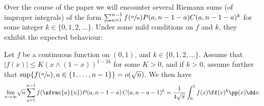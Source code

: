 Over the course of the paper we will encounter several Riemann sums (of improper integrals) of the form
$
\sum_{a=1}^{n-1} f(\sfrac{a}{n})P(a,n-1-a) C(a,n-1-a)^k
$ for some integer $k \in \{0,1,2,\dots \}$. Under some mild conditions on $f$ and $k$, they exhibit the expected behaviour:

\begin{prop}\label{prop:generalintegrallimit}
Let $f$ be a continuous function on $(0,1)$, and $k\in \{0,1,2, \dots \}$. Assume that $|f(x)|\leq K(x \wedge (1-x))^{1-2k}$ for some $K>0$, and if $k>0$, assume further that $\sup\{f(\sfrac{a}{n}),a\in\{1,\ldots,n-1\}\}=o(\sqrt{n})$. We then have
\begin{equation}\label{eq:limsumwithC}
\underset{n\to\infty}\lim\sqrt{n} \sum_{a=1}^{n-1} f{(\sfrac{a}{n})}P(a,n-1-a)\,C(a,n-a-1)^k = \frac{1}{4\sqrt{\pi}}\int_0^1 f(x)\ff(x)^k \pp(x) \dd x.
\end{equation}
\end{prop}

